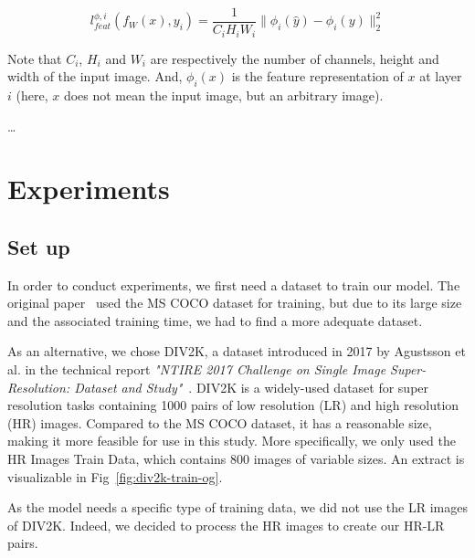 \documentclass{article}
\begin{document}
{        \begin{equation}
            l^{\phi, i}_{feat}(f_W(x), y_i) = 
                \frac{1}{C_i H_i W_i}
                \lVert 
                    \phi_i (\hat y) - \phi_i (y)
                \rVert_2^2
            \label{loss-formula}
        \end{equation}

        Note that $C_i$, $H_i$ and $W_i$ are respectively the number of channels, height and width of the input image. And, $\phi_i (x)$ is the feature representation of $x$ at layer $i$ (here, $x$ does not mean the input image, but an arbitrary image).
}

\label{sec:implementation}
{
    …
}

{
    \section{Experiments}
    \label{sec:experiments}

        \subsection{Set up}
        \label{subsec:setup}

        In order to conduct experiments, we first need a dataset to train our model. The original paper~\cite{https://doi.org/10.48550/arxiv.1603.08155} used the MS COCO dataset \cite{mscoco} for training, but due to its large size and the associated training time, we had to find a more adequate dataset.
        
        As an alternative, we chose DIV2K, a dataset introduced in 2017 by Agustsson et al. in the technical report \textit{"NTIRE 2017 Challenge on Single Image Super-Resolution: Dataset and Study"}~\cite{div2k-ds}. DIV2K is a widely-used dataset for super resolution tasks containing 1000 pairs of low resolution (LR) and high resolution (HR) images. Compared to the MS COCO dataset, it has a reasonable size, making it more feasible for use in this study. More specifically, we only used the HR Images Train Data, which contains 800 images of variable sizes. An extract is visualizable in Fig~\ref{fig:div2k-train-og}.

        \bigskip

        As the model needs a specific type of training data, we did not use the LR images of DIV2K. Indeed, we decided to process the HR images to create our HR-LR pairs. %

}
\end{document}

